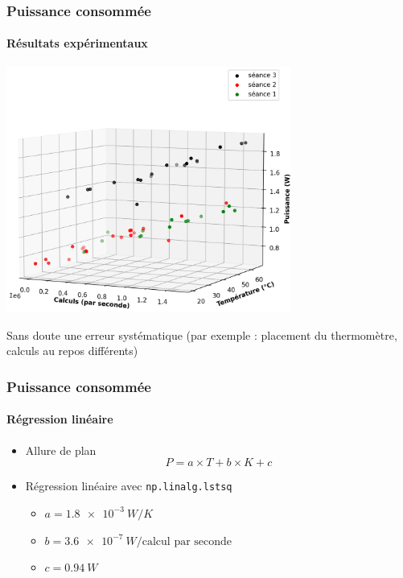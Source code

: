 \documentclass[a4paper,11pt]{beamer}
\newcommand{\p}{\texttt} %
\begin{document}
\begin{frame}
    \frametitle{Puissance consommée}
    \framesubtitle{Résultats expérimentaux}

    \includegraphics[width=0.7\textwidth]{colorisee.png}

    Sans doute une erreur systématique (par exemple : placement du thermomètre, calculs au repos différents)
\end{frame}

\begin{frame}
    \frametitle{Puissance consommée}
    \framesubtitle{Régression linéaire}

    \begin{itemize}
        \item Allure de plan
        $$P = a \times T + b \times K + c$$
        \item Régression linéaire avec \p{np.linalg.lstsq}
        \begin{itemize}
            \item $a = \SI{1.8e-3}{W/K}$
            \item $b = \SI{3.6e-7}{W/\text{calcul par seconde}}$
            \item $c = \SI{0.94}{W}$
        \end{itemize}
    \end{itemize}
\end{frame}
\end{document}
